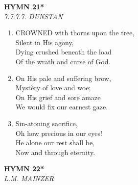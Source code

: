 \newpage
\begin{center}
    {\Large \textbf{HYMN 21*}}
    \\
    \textit{7.7.7.7. DUNSTAN}
\end{center}
\vspace{1em}

\begin{enumerate}
    \item CROWNED with thorns upon the tree, \\
        Silent in His agony, \\
        Dying crushed beneath the load \\
        Of the wrath and curse of God.

    \item On His pale and suffering brow, \\
        Myst\`ery of love and woe; \\
        On His grief and sore amaze \\
        We would fix our earnest gaze.

    \item Sin-atoning sacrifice, \\
        Oh how precious in our eyes! \\
        He alone our rest shall be, \\
        Now and through eternity.

\end{enumerate}

\newpage
\begin{center}
    {\Large \textbf{HYMN 22*}}
    \\
    \textit{L.M. MAINZER}
\end{center}
\vspace{1em}

